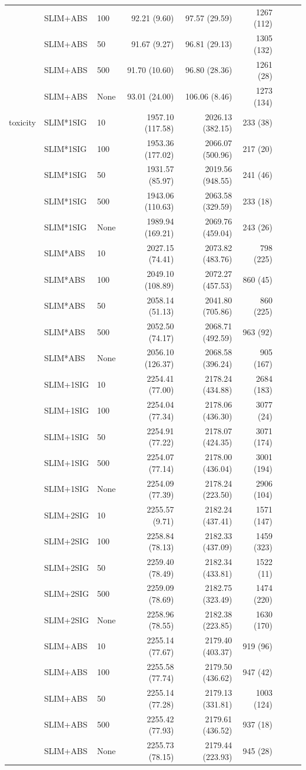 \begin{longtable}{lllrrrrrr}
 & SLIM+ABS & 100 & 92.21 (9.60) & 97.57 (29.59) & 1267 (112) \\
 & SLIM+ABS & 50 & 91.67 (9.27) & 96.81 (29.13) & 1305 (132) \\
 & SLIM+ABS & 500 & 91.70 (10.60) & 96.80 (28.36) & 1261 (28) \\
 & SLIM+ABS & None & 93.01 (24.00) & 106.06 (8.46) & 1273 (134) \\
\midrule
toxicity & SLIM*1SIG & 10 & 1957.10 (117.58) & 2026.13 (382.15) & 233 (38) \\
 & SLIM*1SIG & 100 & 1953.36 (177.02) & 2066.07 (500.96) & 217 (20) \\
 & SLIM*1SIG & 50 & 1931.57 (85.97) & 2019.56 (948.55) & 241 (46) \\
 & SLIM*1SIG & 500 & 1943.06 (110.63) & 2063.58 (329.59) & 233 (18) \\
 & SLIM*1SIG & None & 1989.94 (169.21) & 2069.76 (459.04) & 243 (26) \\
 & SLIM*ABS & 10 & 2027.15 (74.41) & 2073.82 (483.76) & 798 (225) \\
 & SLIM*ABS & 100 & 2049.10 (108.89) & 2072.27 (457.53) & 860 (45) \\
 & SLIM*ABS & 50 & 2058.14 (51.13) & 2041.80 (705.86) & 860 (225) \\
 & SLIM*ABS & 500 & 2052.50 (74.17) & 2068.71 (492.59) & 963 (92) \\
 & SLIM*ABS & None & 2056.10 (126.37) & 2068.58 (396.24) & 905 (167) \\
 & SLIM+1SIG & 10 & 2254.41 (77.00) & 2178.24 (434.88) & 2684 (183) \\
 & SLIM+1SIG & 100 & 2254.04 (77.34) & 2178.06 (436.30) & 3077 (24) \\
 & SLIM+1SIG & 50 & 2254.91 (77.22) & 2178.07 (424.35) & 3071 (174) \\
 & SLIM+1SIG & 500 & 2254.07 (77.14) & 2178.00 (436.04) & 3001 (194) \\
 & SLIM+1SIG & None & 2254.09 (77.39) & 2178.24 (223.50) & 2906 (104) \\
 & SLIM+2SIG & 10 & 2255.57 (9.71) & 2182.24 (437.41) & 1571 (147) \\
 & SLIM+2SIG & 100 & 2258.84 (78.13) & 2182.33 (437.09) & 1459 (323) \\
 & SLIM+2SIG & 50 & 2259.40 (78.49) & 2182.34 (433.81) & 1522 (11) \\
 & SLIM+2SIG & 500 & 2259.09 (78.69) & 2182.75 (323.49) & 1474 (220) \\
 & SLIM+2SIG & None & 2258.96 (78.55) & 2182.38 (223.85) & 1630 (170) \\
 & SLIM+ABS & 10 & 2255.14 (77.67) & 2179.40 (403.37) & 919 (96) \\
 & SLIM+ABS & 100 & 2255.58 (77.74) & 2179.50 (436.62) & 947 (42) \\
 & SLIM+ABS & 50 & 2255.14 (77.28) & 2179.13 (331.81) & 1003 (124) \\
 & SLIM+ABS & 500 & 2255.42 (77.93) & 2179.61 (436.52) & 937 (18) \\
 & SLIM+ABS & None & 2255.73 (78.15) & 2179.44 (223.93) & 945 (28) \\
\end{longtable}